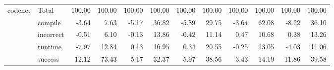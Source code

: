 \begin{tabular}{llrrrrrrrrrr}
\cline{1-12}
\multirow[t]{5}{*}{codenet} & Total & 100.00 & 100.00 & 100.00 & 100.00 & 100.00 & 100.00 & 100.00 & 100.00 & 100.00 & 100.00 \\
 & compile & -3.64 & 7.63 & -5.17 & 36.82 & -5.89 & 29.75 & -3.64 & 62.08 & -8.22 & 36.10 \\
 & incorrect & -0.51 & 6.10 & -0.13 & 13.86 & -0.42 & 11.14 & 0.47 & 10.68 & 0.38 & 13.26 \\
 & runtime & -7.97 & 12.84 & 0.13 & 16.95 & 0.34 & 20.55 & -0.25 & 13.05 & -4.03 & 11.06 \\
 & success & 12.12 & 73.43 & 5.17 & 32.37 & 5.97 & 38.56 & 3.43 & 14.19 & 11.86 & 39.58 \\
\cline{1-12}
\bottomrule
\end{tabular}
